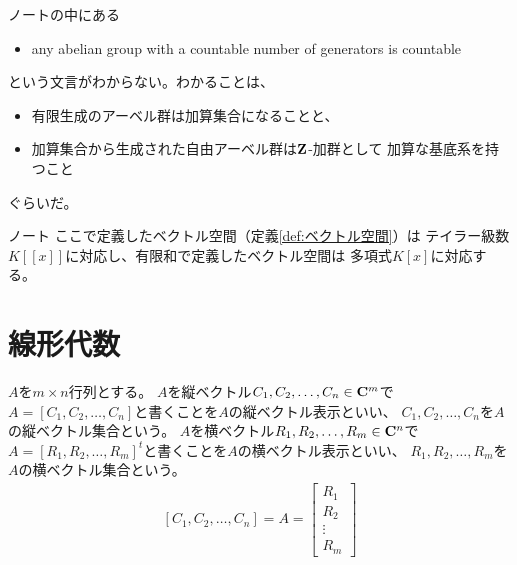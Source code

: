 	\begin{note}[加算な生成系を持つアーベル群]
	\label{note:加算な生成系を持つアーベル群} %
		ノート\cite{schroeer.baer}の中にある
		\begin{itemize}\setlength{\itemsep}{-1mm} %
			\item any abelian group with a countable number of generators is countable
		\end{itemize} %
		という文言がわからない。わかることは、
		\begin{itemize}\setlength{\itemsep}{-1mm} %
			\item 有限生成のアーベル群は加算集合になることと、
			\item 加算集合から生成された自由アーベル群は$\mathbf{Z}$-加群として
			加算な基底系を持つこと
		\end{itemize} %
		ぐらいだ。
	\end{note} %

	\begin{todo}[基底を持たないベクトル空間]
	\label{todo:基底を持たないベクトル空間} %
		ノート\cite{schroeer.baer}
		ここで定義したベクトル空間（定義\ref{def:ベクトル空間}）は
		テイラー級数$K[[x]]$に対応し、有限和で定義したベクトル空間は
		多項式$K[x]$に対応する。
	\end{todo} %
\section{線形代数}\label{s1:線形代数} %
	\begin{definition}[行列の縦横表示]\label{def:行列の縦横表示} %
		$A$を$m\times n$行列とする。
		$A$を縦ベクトル$C_1,C_2,\dots,C_n\in\mathbf{C}^m$で
		$A=[C_1,C_2,\dots,C_n]$と書くことを$A$の縦ベクトル表示といい、
		$C_1,C_2,\dots,C_n$を$A$の縦ベクトル集合という。
		$A$を横ベクトル$R_1,R_2,\dots,R_m\in\mathbf{C}^n$で
		$A=[R_1,R_2,\dots,R_m]^t$と書くことを$A$の横ベクトル表示といい、
		$R_1,R_2,\dots,R_m$を$A$の横ベクトル集合という。
		\begin{equation*}\begin{split}
			[C_1,C_2,\dots,C_n] = A = \begin{bmatrix}
				R_1 \\ R_2 \\ \vdots \\ R_m
			\end{bmatrix}
		\end{split}\end{equation*}
	\end{definition} %

